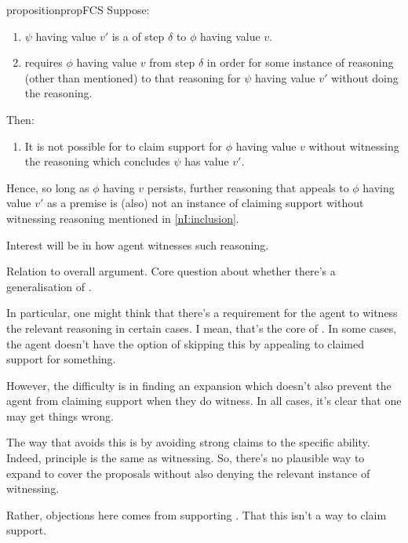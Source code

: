 \begin{note}
  \begin{restatable}{proposition}{propFCS}
    \label{prop:fcs}
    Suppose:

    \begin{enumerate}
    \item
      \(\psi\) having value \(v'\) is a \crequ{} of step \(\delta\) to \(\phi\) having value \(v\).
    \item
      \vAgent{} requires \(\phi\) having value \(v\) from step \(\delta\)
      in order for some instance of reasoning (other than mentioned) to \indicateN{} that reasoning for \(\psi\) having value \(v'\) without doing the reasoning.
    \end{enumerate}

    Then:
    \begin{enumerate}[resume]
    \item
      It is not possible for \vAgent{} to claim support for \(\phi\) having value \(v\) without witnessing the reasoning which concludes \(\psi\) has value \(v'\).
    \end{enumerate}
    \vspace{-\baselineskip}
  \end{restatable}

  Hence, so long as \(\phi\) having \(v\) persists, further reasoning that appeals to \(\phi\) having value \(v'\) as a premise is (also) not an instance of claiming support without witnessing reasoning mentioned in \ref{nI:inclusion}.

  {
    \color{red}
    Interest will be in how agent witnesses such reasoning.
  }
\end{note}

\begin{note}
  {
    \color{red} Relation to overall argument.
  }
  Core question about whether there's a generalisation of \ideaCS{}.

  In particular, one might think that there's a requirement for the agent to witness the relevant reasoning in certain cases.
  I mean, that's the core of \ideaCS{}.
  In some cases, the agent doesn't have the option of skipping this by appealing to claimed support for something.

  However, the difficulty is in finding an expansion which doesn't also prevent the agent from claiming support when they do witness.
  In all cases, it's clear that one may get things wrong.

  The way that \adB{} avoids this is by avoiding strong claims to the specific ability.
  Indeed, principle is the same as witnessing.
  So, there's no plausible way to expand \ideaCS{} to cover the proposals without also denying the relevant instance of witnessing.

  Rather, objections here comes from supporting \ESU{}.
  That this isn't a way to claim support.
\end{note}

